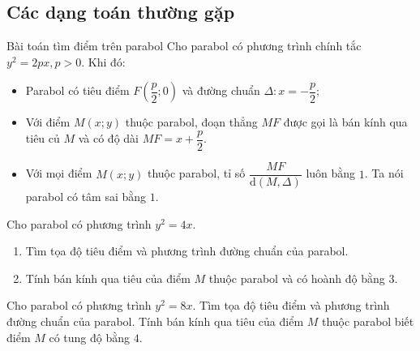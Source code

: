 \subsection{Các dạng toán thường gặp}
\begin{dang}{Bài toán tìm điểm trên parabol}
	Cho parabol có phương trình chính tắc $y^2=2 p x, p>0$. Khi đó:
	\begin{itemize}
		\item Parabol có tiêu điểm $F\left(\dfrac{p}{2} ; 0\right)$ và đường chuẩn $\Delta: x=-\dfrac{p}{2}$;
		\item Với điểm $M(x ; y)$ thuộc parabol, đoạn thẳng $M F$ được gọi là bán kính qua tiêu củ $M$ và có độ dài $M F=x+\dfrac{p}{2}$.
		\item Với mọi điểm $M(x ; y)$ thuộc parabol, tỉ số $\dfrac{M F}{\mathrm{d}(M, \Delta)}$ luôn bằng $ 1  $. Ta nói parabol có tâm sai bằng $ 1 $.
	\end{itemize}
	
\end{dang}
\begin{vd}
	Cho parabol có phương trình $ y^2=4x $.
	\begin{enumerate}
		\item Tìm tọa độ tiêu điểm và phương trình đường chuẩn của parabol.
		\item Tính bán kính qua tiêu của điểm $M$ thuộc parabol và có hoành độ bằng $ 3 $.
	\end{enumerate}
	
	\end{vd}
\begin{vd}
	 Cho parabol có phương trình $y^2=8 x$. Tìm tọa độ tiêu điểm và phương trình đường chuẩn của parabol. Tính bán kính qua tiêu của điểm $M$ thuộc parabol biết điểm $M$ có tung độ bằng $4 .$
	\end{vd}
